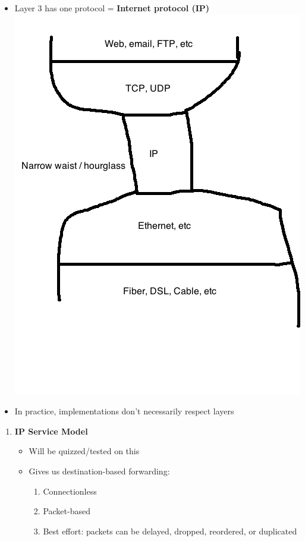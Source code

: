 \documentclass[11pt]{article}
\begin{document}
\begin{itemize}
\item Layer 3 has one protocol = \textbf{Internet protocol (IP)}
      \includegraphics[width=.9\linewidth]{diagrams/fig4.png}

\item In practice, implementations don't necessarily respect layers
\end{itemize}

\begin{enumerate}
\item \textbf{IP Service Model}
\label{sec:orgheadline13}
\begin{itemize}
\item Will be quizzed/tested on this
\item Gives us destination-based forwarding:
\begin{enumerate}
\item Connectionless
\item Packet-based
\item Best effort: packets can be delayed, dropped, reordered, or duplicated
\end{enumerate}
\end{itemize}
\end{enumerate}
\end{document}

